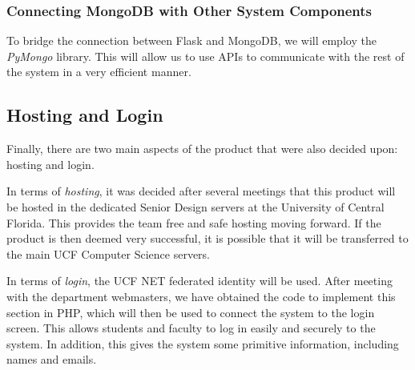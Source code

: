 \documentclass[titlepage, 12pt]{article}
\begin{document}
\subsubsection{Connecting MongoDB with Other System Components}

To bridge the connection between Flask and MongoDB, we will employ the \emph{PyMongo} library. This will allow us to use APIs to communicate with the rest of the system in a very efficient manner. 

\subsection{Hosting and Login}

Finally, there are two main aspects of the product that were also decided upon: hosting and login.

In terms of \emph{hosting}, it was decided after several meetings that this product will be hosted in the dedicated Senior Design servers at the University of Central Florida. This provides the team free and safe hosting moving forward. If the product is then deemed very successful, it is possible that it will be transferred to the main UCF Computer Science servers.

In terms of \emph{login}, the UCF NET federated identity will be used. After meeting with the department webmasters, we have obtained the code to implement this section in PHP, which will then be used to connect the system to the login screen. This allows students and faculty to log in easily and securely to the system. In addition, this gives the system some primitive information, including names and emails.
\end{document}
